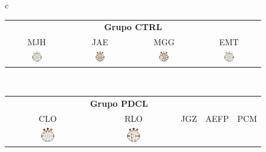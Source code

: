 \documentclass[10pt,a4paper]{article}
\begin{document}
\begin{figure}
\centering
\begin{tabular}{c}
\begin{tabular}{cccc}
\multicolumn{4}{c}{\textbf{Grupo CTRL}} \\
MJH & JAE & MGG & EMT \\
\includegraphics[width=0.17\textwidth]{./img_art_dfa/prop_MJH_30.pdf} &
\includegraphics[width=0.17\textwidth]{./img_art_dfa/prop_JAE_30.pdf} &
\includegraphics[width=0.17\textwidth]{./img_art_dfa/prop_MGG_30.pdf} &
\includegraphics[width=0.17\textwidth]{./img_art_dfa/prop_EMT_30.pdf} \\
\end{tabular} \\
\midrule
\begin{tabular}{ccccc}
\multicolumn{4}{c}{\textbf{Grupo PDCL}} \\
CLO & RLO & JGZ & AEFP & PCM \\
\includegraphics[width=0.17\textwidth]{./img_art_dfa/prop_CLO_30.pdf} &
\includegraphics[width=0.17\textwidth]{./img_art_dfa/prop_RLO_30.pdf} &

\end{tabular}
\end{tabular}
\end{figure}
\end{document}

